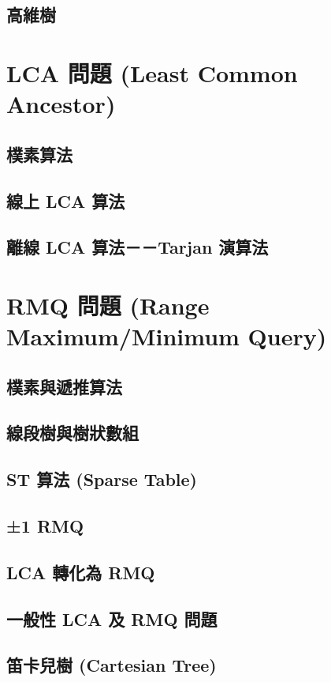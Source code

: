 \documentclass[12pt,a4paper,oneside]{report}
\begin{document}
\begin{CJK}{UTF8}{bkai}
\subsection{高維樹}

\section{LCA 問題 (Least Common Ancestor)}
\subsection{樸素算法}
\subsection{線上 LCA 算法}
\subsection{離線 LCA 算法－－Tarjan 演算法}

\section{RMQ 問題 (Range Maximum/Minimum Query)}\label{tree:sec:rmq}

\subsection{樸素與遞推算法}
\subsection{線段樹與樹狀數組}
\subsection{ST 算法 (Sparse Table)}
\subsection{±1 RMQ}
\subsection{LCA 轉化為 RMQ}
\subsection{一般性 LCA 及 RMQ 問題}
\subsection{笛卡兒樹 (Cartesian Tree)}

\ifx \allfiles \undefined
\printindex[noun]

\clearpage
\end{CJK}
\end{document}
